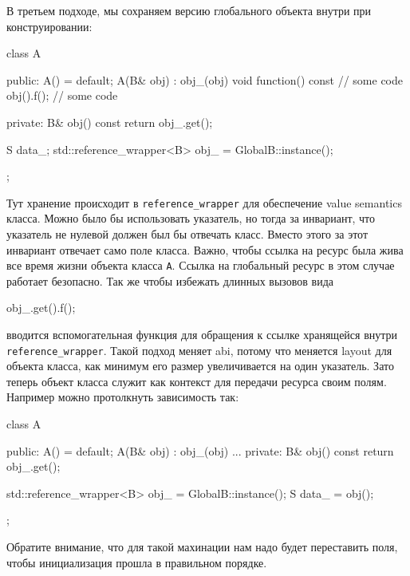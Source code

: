 В третьем подходе, мы сохраняем версию глобального объекта внутри при конструировании:
\begin{cppcode}
class A {
public:
  A() = default;
  A(B& obj) : obj_(obj) {}
  void function() const {
    // some code
    obj().f();
    // some code
  }

private:
  B&  obj() const {
    return obj_.get();
  }
  
  S data_;
  std::reference_wrapper<B> obj_ = GlobalB::instance();
};
\end{cppcode}
Тут хранение происходит в \verb"reference_wrapper" для обеспечение value semantics класса.
Можно было бы использовать указатель, но тогда за инвариант, что указатель не нулевой должен был бы отвечать класс.
Вместо этого за этот инвариант отвечает само поле класса.
Важно, чтобы ссылка на ресурс была жива все время жизни объекта класса \verb"A".
Ссылка на глобальный ресурс в этом случае работает безопасно.
Так же чтобы избежать длинных вызовов вида
\begin{cppcode}[numbers = none]
obj_.get().f();
\end{cppcode}
вводится вспомогательная функция для обращения к ссылке хранящейся внутри \verb"reference_wrapper".
Такой подход меняет abi, потому что меняется layout для объекта класса, как минимум его размер увеличивается на один указатель.
Зато теперь объект класса служит как контекст для передачи ресурса своим полям.
Например можно протолкнуть зависимость так:
\begin{cppcode}
class A {
public:
  A() = default;
  A(B& obj) : obj_(obj) {}
  ...
private:
  B&  obj() const {
    return obj_.get();
  }

  std::reference_wrapper<B> obj_ = GlobalB::instance();
  S data_ = obj();
};
\end{cppcode}
Обратите внимание, что для такой махинации нам надо будет переставить поля, чтобы инициализация прошла в правильном порядке.


